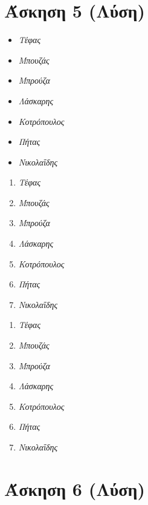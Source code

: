 \documentclass[a4paper,11pt]{article}
\begin{document}
\vspace{20pt}

\section{Άσκηση 5 (Λύση)}
		
	\begin{itemize}  
	\item \textit{Τέφας}
	\item \textit{Μπουζάς}
	\item \textit{Μπρούζα}
	\item \textit{Λάσκαρης}
	\item \textit{Κοτρόπουλος}
	\item \textit{Πήτας}
	\item \textit{Νικολαΐδης}	
	\end{itemize}	
	
	\begin{enumerate}  
	\item \textit{Τέφας}
	\item \textit{Μπουζάς}
	\item \textit{Μπρούζα}
	\item \textit{Λάσκαρης}
	\item \textit{Κοτρόπουλος}
	\item \textit{Πήτας}
	\item \textit{Νικολαΐδης}	
	\end{enumerate}	
	
	\begin{enumerate}[label=\textbf(\greek*)]
	\item \textit{Τέφας}
	\item \textit{Μπουζάς}
	\item \textit{Μπρούζα}
	\item \textit{Λάσκαρης}
	\item \textit{Κοτρόπουλος}
	\item \textit{Πήτας}
	\item \textit{Νικολαΐδης}	
	\end{enumerate}	

\vspace{20pt}

\section{Άσκηση 6 (Λύση)}
\end{document}
